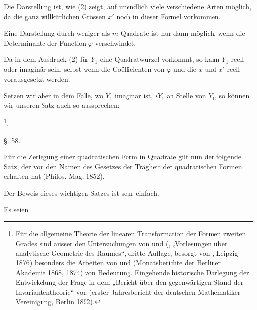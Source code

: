 
Die Darstellung ist, wie (2) zeigt, auf unendlich viele verschiedene Arten möglich, da die ganz willkürlichen Grössen $x'$ noch in dieser Formel vorkommen.

Eine Darstellung durch weniger als $m$ Quadrate ist nur dann möglich, wenn die Determinante der Function $\varphi$ verschwindet.

Da in dem Ausdruck (2) für $Y_1$ eine Quadratwurzel vorkommt, so kann $Y_1$ reell oder imaginär sein, selbst wenn die Co\"efficienten von $\varphi$ und die $x$ und $x'$ reell vorausgesetzt werden.

Setzen wir aber in dem Falle, wo $Y_1$ imaginär ist, $iY_1$ an Stelle von $Y_1$, so können wir unseren Satz auch so aussprechen:

\footnote{Für die allgemeine Theorie der linearen Transformation der Formen zweiten Grades sind ausser den Untersuchungen von  und  (, „Vorlesungen über analytische Geometrie des Raumes“, dritte Auflage, besorgt von , Leipzig 1876) besonders die Arbeiten von  und  (Monatsberichte der Berliner Akademie 1868, 1874) von Bedeutung. Eingehende historische Darlegung der Entwickelung der Frage in dem „Bericht über den gegenwärtigen Stand der Invariantentheorie“ von  (erster Jahresbericht der deutschen Mathematiker-Vereinigung, Berlin 1892).}.

\begin{center}
\S. 58.

\end{center}

Für die Zerlegung einer quadratischen Form in Quadrate gilt nun der folgende Satz, der von  den Namen des Gesetzes der Trägheit der quadratischen Formen erhalten hat (Philos. Mag. 1852).


Der Beweis dieses wichtigen Satzes ist sehr einfach.

Es seien
